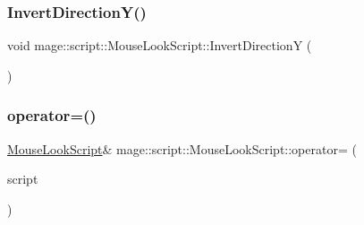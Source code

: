 \hypertarget{classmage_1_1script_1_1_mouse_look_script_a189145ae96f56b805fe2020ed75db0bc}{}\label{classmage_1_1script_1_1_mouse_look_script_a189145ae96f56b805fe2020ed75db0bc} 
\subsubsection{\texorpdfstring{Invert\+Direction\+Y()}{InvertDirectionY()}}
{\footnotesize\ttfamily void mage\+::script\+::\+Mouse\+Look\+Script\+::\+Invert\+DirectionY (\begin{DoxyParamCaption}{ }\end{DoxyParamCaption})\hspace{0.3cm}{\ttfamily [noexcept]}}

\hypertarget{classmage_1_1script_1_1_mouse_look_script_af7da565d15422579ab5ff34f8f6bbc6a}{}\label{classmage_1_1script_1_1_mouse_look_script_af7da565d15422579ab5ff34f8f6bbc6a} 
\subsubsection{\texorpdfstring{operator=()}{operator=()}\hspace{0.1cm}{\footnotesize\ttfamily [1/2]}}
{\footnotesize\ttfamily \hyperlink{classmage_1_1script_1_1_mouse_look_script}{Mouse\+Look\+Script}\& mage\+::script\+::\+Mouse\+Look\+Script\+::operator= (\begin{DoxyParamCaption}\item[{const \hyperlink{classmage_1_1script_1_1_mouse_look_script}{Mouse\+Look\+Script} \&}]{script }\end{DoxyParamCaption})\hspace{0.3cm}{\ttfamily [delete]}}

\hypertarget{classmage_1_1script_1_1_mouse_look_script_a019b949f86d066507ea74a9db126137e}{}\label{classmage_1_1script_1_1_mouse_look_script_a019b949f86d066507ea74a9db126137e} 
